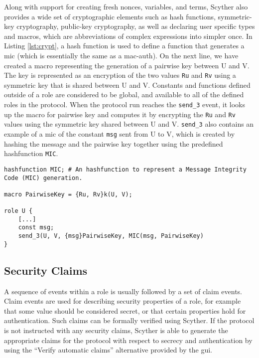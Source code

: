 Along with support for creating fresh nonces, variables, and terms, Scyther also provides a wide set of cryptographic elements such as hash functions, symmetric-key cryptography, public-key cryptography, as well as declaring user specific types and macros, which are abbreviations of complex expressions into simpler once. In Listing \ref{lst:crypt}, a hash function is used to define a function that generates a \gls{mic} (which is essentially the same as a \gls{mac-auth}). On the next line, we have created a macro representing the generation of a pairwise key between U and V. The key is represented as an encryption of the two values \texttt{Ru} and \texttt{Rv} using a symmetric key that is shared between U and V. Constants and functions defined outside of a role are considered to be global, and available to all of the defined roles in the protocol. When the protocol run reaches the \texttt{send\_3} event, it looks up the macro for pairwise key and computes it by encrypting the \texttt{Ru} and \texttt{Rv} values using the symmetric key shared between U and V. \texttt{send\_3} also contains an example of a \gls{mic} of the constant \texttt{msg} sent from U to V, which is created by hashing the message and the pairwise key together using the predefined hashfunction \texttt{MIC}.\newline


\begin{lstlisting}[caption={Example on how to use hashfunctions, macros and encryption.}, label={lst:crypt}]
hashfunction MIC; # An hashfunction to represent a Message Integrity Code (MIC) generation.

macro PairwiseKey = {Ru, Rv}k(U, V);

role U {
	[...]
	const msg;
	send_3(U, V, {msg}PairwiseKey, MIC(msg, PairwiseKey)
}
\end{lstlisting}


\subsection{Security Claims}
\label{subsec:claims}

A sequence of events within a role is usually followed by a set of claim events. Claim events are used for describing security properties of a role, for example that some value should be considered secret, or that certain properties hold for authentication. Such claims can be formally verified using Scyther. If the protocol is not instructed with any security claims, Scyther is able to generate the appropriate claims  for the protocol with respect to secrecy and authentication by using the ``Verify automatic claims'' alternative provided by the \gls{gui}.

